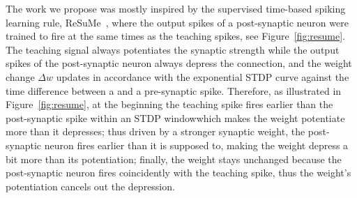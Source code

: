 The work we propose was mostly inspired by the supervised time-based spiking learning rule, ReSuMe~\citep{ponulak2010supervised}, where the output spikes of a post-synaptic neuron were trained to fire at the same times as the teaching spikes, see Figure~\ref{fig:resume}.
The teaching signal always potentiates the synaptic strength while the output spikes of the post-synaptic neuron always depress the connection, and the weight change $\Delta w$ updates in accordance with the exponential STDP curve against the time difference between a \DIFdelbegin {}\DIFdelend \DIFaddbegin {}\DIFaddend and a pre-synaptic spike.
Therefore, as illustrated in Figure~\ref{fig:resume}, at the beginning the teaching spike fires earlier than the post-synaptic spike within an STDP window\DIFaddbegin {}\DIFaddend which makes the weight potentiate more than it depresses;
thus \DIFaddbegin {}\DIFaddend driven by a stronger synaptic weight, the post-synaptic neuron fires earlier than it is supposed to, making the weight depress a bit more than its potentiation;
finally, the weight stays unchanged because the post-synaptic neuron fires coincidently with the teaching spike, thus the weight's potentiation cancels out the depression.
